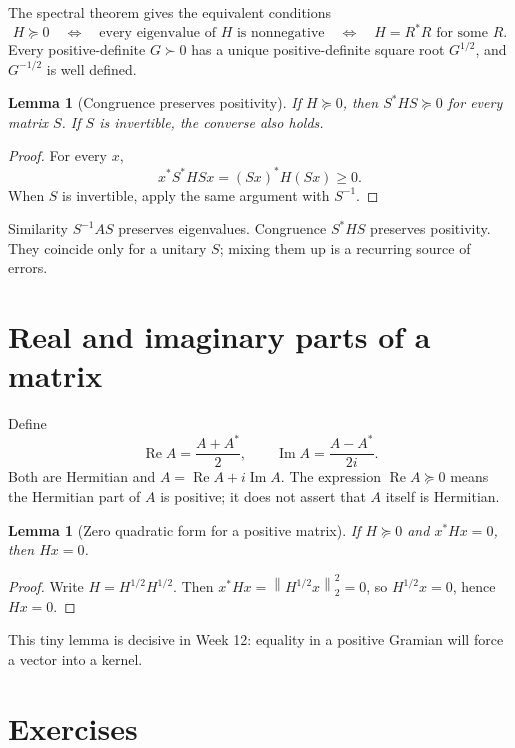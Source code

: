 \documentclass[11pt,oneside,openany]{book}
\newtheorem{lemma}[theorem]{Lemma}
\theoremstyle{definition}
\theoremstyle{remark}
\newcommand{\RePart}{\operatorname{Re}}
\newcommand{\ImPart}{\operatorname{Im}}
\newcommand{\norm}[1]{\left\lVert #1\right\rVert}
\begin{document}
The spectral theorem gives the equivalent conditions
\[
  H\succeq0
  \quad\Longleftrightarrow\quad
  \text{every eigenvalue of \(H\) is nonnegative}
  \quad\Longleftrightarrow\quad
  H=R^*R\text{ for some }R.
\]
Every positive-definite \(G\succ0\) has a unique positive-definite
square root \(G^{1/2}\), and \(G^{-1/2}\) is well defined.

\begin{lemma}[Congruence preserves positivity]
\label{lem:congruence}
If \(H\succeq0\), then \(S^*HS\succeq0\) for every matrix \(S\).
If \(S\) is invertible, the converse also holds.
\end{lemma}

\begin{proof}
For every \(x\),
\[
  x^*S^*HSx=(Sx)^*H(Sx)\geq0.
\]
When \(S\) is invertible, apply the same argument with \(S^{-1}\).
\end{proof}

Similarity \(S^{-1}AS\) preserves eigenvalues.  Congruence \(S^*HS\)
preserves positivity.  They coincide only for a unitary \(S\); mixing
them up is a recurring source of errors.

\section{Real and imaginary parts of a matrix}

Define
\[
  \RePart A=\frac{A+A^*}{2},
  \qquad
  \ImPart A=\frac{A-A^*}{2i}.
\]
Both are Hermitian and \(A=\RePart A+i\ImPart A\).  The expression
\(\RePart A\succeq0\) means the Hermitian part of \(A\) is positive;
it does not assert that \(A\) itself is Hermitian.

\begin{lemma}[Zero quadratic form for a positive matrix]
\label{lem:psd-zero}
If \(H\succeq0\) and \(x^*Hx=0\), then \(Hx=0\).
\end{lemma}

\begin{proof}
Write \(H=H^{1/2}H^{1/2}\).  Then
\(x^*Hx=\norm{H^{1/2}x}_2^2=0\), so \(H^{1/2}x=0\), hence \(Hx=0\).
\end{proof}

This tiny lemma is decisive in Week 12: equality in a positive Gramian
will force a vector into a kernel.

\section{Exercises}
\end{document}
